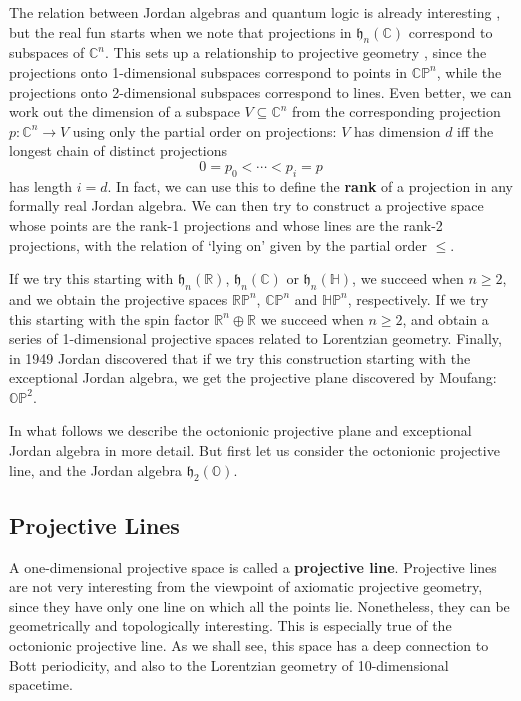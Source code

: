 \documentclass[12pt]{article}
\newcommand\R{{\mathbb R}}
\newcommand\C{{\mathbb C}}
\renewcommand\H{{\mathbb H}}
\renewcommand\O{{\mathbb O}}
\newcommand\RP{{\mathbb {RP}}}
\newcommand\CP{{\mathbb {CP}}}
\newcommand\HP{{\mathbb {HP}}}
\newcommand\OP{{\mathbb {OP}}}
\newcommand{\h}{{\mathfrak {h}}}
\newcommand{\maps}{\colon}
\begin{document}
The relation between Jordan algebras and quantum logic is already 
interesting \cite{Emch}, but the real fun starts when we note 
that projections in $\h_n(\C)$ correspond to subspaces of $\C^n$.   This 
sets up a relationship to projective geometry \cite{Varadarajan}, since 
the projections onto 1-dimensional subspaces correspond to points in 
$\CP^n$, while the projections onto 2-dimensional subspaces correspond 
to lines.  Even better, we can work out the dimension of a subspace $V 
\subseteq \C^n$ from the corresponding projection $p \maps \C^n \to V$ 
using only the partial order on projections: $V$ has dimension $d$ iff 
the longest chain of distinct projections  
\[   0 = p_0 < \cdots < p_i = p  \] 
has length $i = d$.  In fact, we can use this to define the {\bf rank} 
of a projection in any formally real Jordan algebra.  We can then try to 
construct a projective space whose points are the rank-1 projections and 
whose lines are the rank-2 projections, with the relation of `lying on' 
given by the partial order $\le$.   
 
If we try this starting with $\h_n(\R)$, $\h_n(\C)$ or $\h_n(\H)$, we 
succeed when $n \ge 2$, and we obtain the projective spaces $\RP^n$, 
$\CP^n$ and $\HP^n$, respectively.  If we try this starting with the 
spin factor $\R^n \oplus \R$ we succeed when $n \ge 2$, and obtain a 
series of 1-dimensional projective spaces related to Lorentzian 
geometry.  Finally, in 1949 Jordan \cite{Jordan2} discovered that if we 
try this construction starting with the exceptional Jordan algebra, we 
get the projective plane discovered by Moufang: $\OP^2$.  
 
In what follows we describe the octonionic projective plane 
and exceptional Jordan algebra in more detail.  But first let us
consider the octonionic projective line, and the Jordan algebra
$\h_2(\O)$.
 
\subsection{Projective Lines}  \label{OP1} 
 
A one-dimensional projective space is called a {\bf projective line}. 
Projective lines are not very interesting from the viewpoint of 
axiomatic projective geometry, since they have only one line on which 
all the points lie.  Nonetheless, they can be geometrically and 
topologically interesting.  This is especially true of the octonionic 
projective line.  As we shall see, this space has a deep connection to 
Bott periodicity, and also to the Lorentzian geometry of 10-dimensional 
spacetime. 
 
\end{document}
